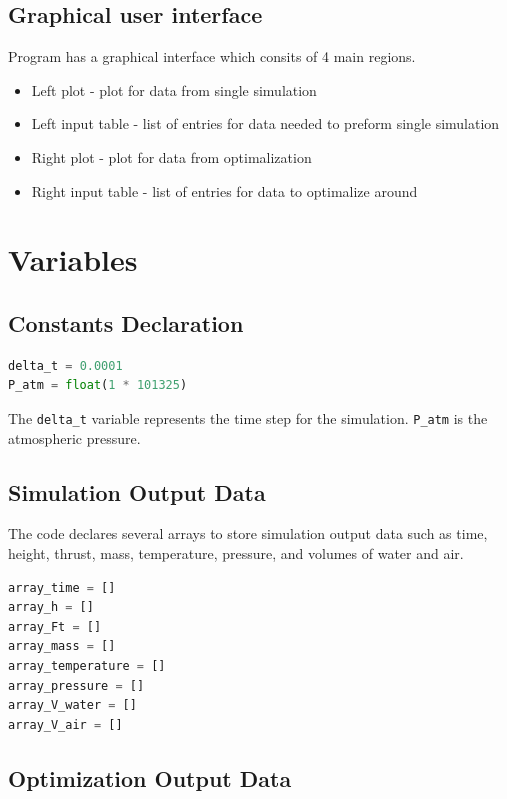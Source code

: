 \documentclass{report}
\begin{document}
\section{Graphical user interface}
Program has a graphical interface which consits of 4 main regions. 
\begin{itemize}
\item Left plot - plot for data from single simulation
\item Left input table - list of entries for data needed to preform single simulation
\item Right plot - plot for data from optimalization
\item Right input table - list of entries for data to optimalize around
\end{itemize}

\chapter{Variables}

\section{Constants Declaration}
 
\begin{lstlisting}[language=Python]
delta_t = 0.0001
P_atm = float(1 * 101325)
\end{lstlisting}
The \texttt{delta\_t} variable represents the time step for the simulation. \texttt{P\_atm} is the atmospheric pressure.

\section{Simulation Output Data}

The code declares several arrays to store simulation output data such as time, height, thrust, mass, temperature, pressure, and volumes of water and air.

\begin{lstlisting}[language=Python]
array_time = []
array_h = []
array_Ft = []
array_mass = []
array_temperature = []
array_pressure = []
array_V_water = []
array_V_air = []
\end{lstlisting}

\section{Optimization Output Data}
\end{document}
